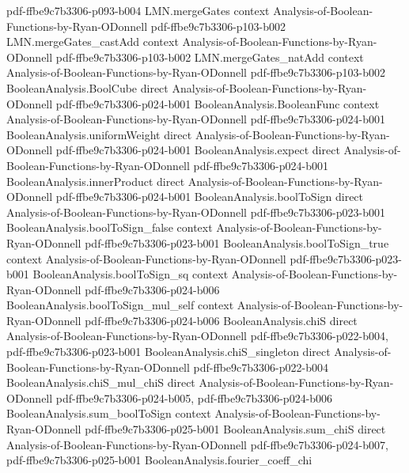 \begin{lemma}
  {pdf-ffbe9c7b3306-p093-b004}
\proofstep
  {LMN.mergeGates}
  {context}
  {Analysis-of-Boolean-Functions-by-Ryan-ODonnell}
  {pdf-ffbe9c7b3306-p103-b002}
\proofstep
  {LMN.mergeGates_castAdd}
  {context}
  {Analysis-of-Boolean-Functions-by-Ryan-ODonnell}
  {pdf-ffbe9c7b3306-p103-b002}
\proofstep
  {LMN.mergeGates_natAdd}
  {context}
  {Analysis-of-Boolean-Functions-by-Ryan-ODonnell}
  {pdf-ffbe9c7b3306-p103-b002}
\proofstep
  {BooleanAnalysis.BoolCube}
  {direct}
  {Analysis-of-Boolean-Functions-by-Ryan-ODonnell}
  {pdf-ffbe9c7b3306-p024-b001}
\proofstep
  {BooleanAnalysis.BooleanFunc}
  {context}
  {Analysis-of-Boolean-Functions-by-Ryan-ODonnell}
  {pdf-ffbe9c7b3306-p024-b001}
\proofstep
  {BooleanAnalysis.uniformWeight}
  {direct}
  {Analysis-of-Boolean-Functions-by-Ryan-ODonnell}
  {pdf-ffbe9c7b3306-p024-b001}
\proofstep
  {BooleanAnalysis.expect}
  {direct}
  {Analysis-of-Boolean-Functions-by-Ryan-ODonnell}
  {pdf-ffbe9c7b3306-p024-b001}
\proofstep
  {BooleanAnalysis.innerProduct}
  {direct}
  {Analysis-of-Boolean-Functions-by-Ryan-ODonnell}
  {pdf-ffbe9c7b3306-p024-b001}
\proofstep
  {BooleanAnalysis.boolToSign}
  {direct}
  {Analysis-of-Boolean-Functions-by-Ryan-ODonnell}
  {pdf-ffbe9c7b3306-p023-b001}
\proofstep
  {BooleanAnalysis.boolToSign_false}
  {context}
  {Analysis-of-Boolean-Functions-by-Ryan-ODonnell}
  {pdf-ffbe9c7b3306-p023-b001}
\proofstep
  {BooleanAnalysis.boolToSign_true}
  {context}
  {Analysis-of-Boolean-Functions-by-Ryan-ODonnell}
  {pdf-ffbe9c7b3306-p023-b001}
\proofstep
  {BooleanAnalysis.boolToSign_sq}
  {context}
  {Analysis-of-Boolean-Functions-by-Ryan-ODonnell}
  {pdf-ffbe9c7b3306-p024-b006}
\proofstep
  {BooleanAnalysis.boolToSign_mul_self}
  {context}
  {Analysis-of-Boolean-Functions-by-Ryan-ODonnell}
  {pdf-ffbe9c7b3306-p024-b006}
\proofstep
  {BooleanAnalysis.chiS}
  {direct}
  {Analysis-of-Boolean-Functions-by-Ryan-ODonnell}
  {pdf-ffbe9c7b3306-p022-b004,
    pdf-ffbe9c7b3306-p023-b001}
\proofstep
  {BooleanAnalysis.chiS_singleton}
  {direct}
  {Analysis-of-Boolean-Functions-by-Ryan-ODonnell}
  {pdf-ffbe9c7b3306-p022-b004}
\proofstep
  {BooleanAnalysis.chiS_mul_chiS}
  {direct}
  {Analysis-of-Boolean-Functions-by-Ryan-ODonnell}
  {pdf-ffbe9c7b3306-p024-b005,
    pdf-ffbe9c7b3306-p024-b006}
\proofstep
  {BooleanAnalysis.sum_boolToSign}
  {context}
  {Analysis-of-Boolean-Functions-by-Ryan-ODonnell}
  {pdf-ffbe9c7b3306-p025-b001}
\proofstep
  {BooleanAnalysis.sum_chiS}
  {direct}
  {Analysis-of-Boolean-Functions-by-Ryan-ODonnell}
  {pdf-ffbe9c7b3306-p024-b007,
    pdf-ffbe9c7b3306-p025-b001}
\proofstep
  {BooleanAnalysis.fourier_coeff_chi}

\end{lemma}
